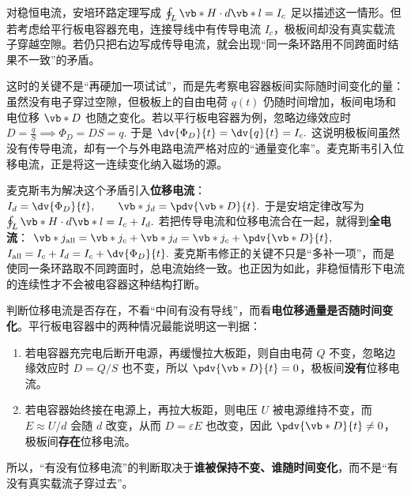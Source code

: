 对稳恒电流，安培环路定理写成
 \(\oint_L \vb*{H}\cdot d\vb*{l}=I_c\)
足以描述这一情形。但若考虑给平行板电容器充电，连接导线中有传导电流 \(I_c\)，极板间却没有真实载流子穿越空隙。若仍只把右边写成传导电流，就会出现“同一条环路用不同跨面时结果不一致”的矛盾。

这时的关键不是“再硬加一项试试”，而是先考察电容器板间实际随时间变化的量：虽然没有电子穿过空隙，但极板上的自由电荷 \(q(t)\) 仍随时间增加，板间电场和电位移 \(\vb*{D}\) 也随之变化。若以平行板电容器为例，忽略边缘效应时
 \(D=\frac{q}{S} \implies \Phi_D=DS=q.\)
于是
 \(\dv{\Phi_D}{t}=\dv{q}{t}=I_c.\)
这说明极板间虽然没有传导电流，却有一个与外电路电流严格对应的“通量变化率”。麦克斯韦引入位移电流，正是将这一连续变化纳入磁场的源。

麦克斯韦为解决这个矛盾引入\textbf{位移电流}：
 \(I_d=\dv{\Phi_D}{t}, \qquad \vb*{j}_d=\pdv{\vb*{D}}{t}.\)
于是安培定律改写为
 \(\oint_L \vb*{H}\cdot d\vb*{l}=I_c+I_d.\)
若把传导电流和位移电流合在一起，就得到\textbf{全电流}：
 \(\vb*{j}_{\mathrm{all}}=\vb*{j}_c+\vb*{j}_d =\vb*{j}_c+\pdv{\vb*{D}}{t},\)
 \(I_{\mathrm{all}}=I_c+I_d =I_c+\dv{\Phi_D}{t}.\)
麦克斯韦修正的关键不只是“多补一项”，而是使同一条环路取不同跨面时，总电流始终一致。也正因为如此，非稳恒情形下电流的连续性才不会被电容器这种结构打断。

\begin{note}
判断位移电流是否存在，不看“中间有没有导线”，而看\textbf{电位移通量是否随时间变化}。平行板电容器中的两种情况最能说明这一判据：
\begin{enumerate}
 \item 若电容器充完电后断开电源，再缓慢拉大板距，则自由电荷 \(Q\) 不变，忽略边缘效应时 \(D=Q/S\) 也不变，所以 \(\pdv{\vb*{D}}{t}=0\)，极板间\textbf{没有}位移电流。
 \item 若电容器始终接在电源上，再拉大板距，则电压 \(U\) 被电源维持不变，而 \(E\approx U/d\) 会随 \(d\) 改变，从而 \(D=\varepsilon E\) 也改变，因此 \(\pdv{\vb*{D}}{t}\neq 0\)，极板间\textbf{存在}位移电流。
\end{enumerate}
所以，“有没有位移电流”的判断取决于\textbf{谁被保持不变、谁随时间变化}，而不是“有没有真实载流子穿过去”。
\end{note}
